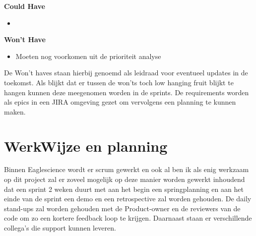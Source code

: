 \textbf{Could Have}
\begin{itemize}
\item
\end{itemize}

\textbf{Won't Have}
\begin{itemize}
  \item Moeten nog voorkomen uit de prioriteit analyse
\end{itemize}
De Won't haves staan hierbij genoemd als leidraad voor eventueel updates in de toekomst. Als blijkt dat er tussen de won'ts toch low hanging fruit blijkt te hangen kunnen deze meegenomen worden in de sprints. De requirements worden als epics in een JIRA omgeving gezet om vervolgens een planning te kunnen maken.


\section{WerkWijze en planning}
Binnen Eaglescience wordt er scrum gewerkt en ook al ben ik als enig werkzaam op dit project zal er zoveel mogelijk op deze manier worden gewerkt inhoudend dat een sprint 2 weken duurt met aan het begin een springplanning en aan het einde van de sprint een demo en een retrospective zal worden gehouden. De daily stand-ups zal worden gehouden met de Product-owner en de reviewers van de code om zo een kortere feedback loop te krijgen. Daarnaast staan er verschillende collega's die support kunnen leveren.
